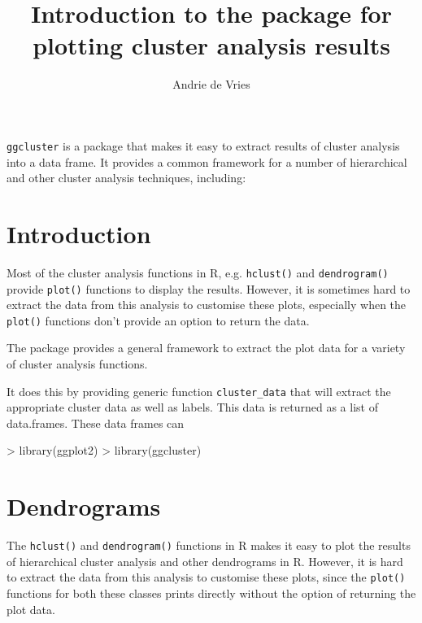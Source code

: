 \documentclass[a4paper]{article}
\title{Introduction to the \ggcluster{} package for plotting cluster analysis results}
\author{Andrie de Vries}
\newcommand{\ggcluster}{{\tt ggcluster}}
\newcommand{\clusterdata}{\code{cluster\_data}}
\newcommand{\code}[1]{{\tt #1}}
\begin{document}
\maketitle

\ggcluster{} is a package that makes it easy to extract results of cluster analysis into a data frame.  It provides a common framework for a number of hierarchical and other cluster analysis techniques, including:

\section{Introduction}

Most of the cluster analysis functions in R, e.g. \code{hclust()} and \code{dendrogram()} provide \code{plot()} functions to display the results.  However, it is sometimes hard to extract the data from this analysis to customise these plots, especially when the \code{plot()} functions don't provide an option to return the data.

The \ggluster{} package provides a general framework to extract the plot data for a variety of cluster analysis functions.

It does this by providing generic function \clusterdata{} that will extract the appropriate cluster data as well as labels.  This data is returned as a list of data.frames.  These data frames can 
  
\begin{Schunk}
\begin{Sinput}
> library(ggplot2)
> library(ggcluster)
\end{Sinput}
\end{Schunk}


\section{Dendrograms}

The \code{hclust()} and \code{dendrogram()} functions in R makes it easy to plot the results of hierarchical cluster analysis and other dendrograms in R.  However, it is hard to extract the data from this analysis to customise these plots, since the \code{plot()} functions for both these classes prints directly without the option of returning the plot data.  
\end{document}
